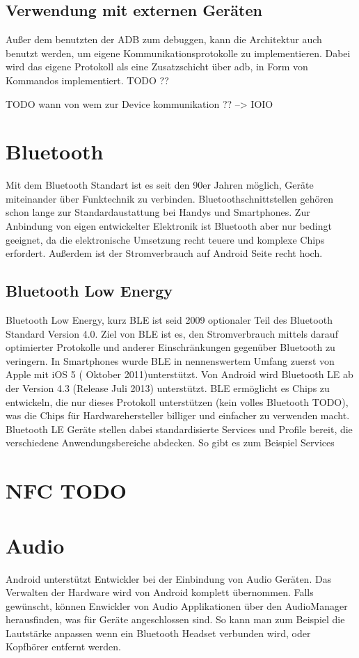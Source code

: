 \documentclass[12pt,journal,compsoc]{IEEEtran}
\begin{document}
\subsection{Verwendung mit externen Geräten}
Außer dem benutzten der ADB zum debuggen, kann die Architektur auch benutzt werden, um eigene Kommunikationsprotokolle zu implementieren.
Dabei wird das eigene Protokoll als eine Zusatzschicht über adb, in Form von Kommandos implementiert. TODO ??


TODO wann von wem zur Device kommunikation ?? --> IOIO

\section{Bluetooth}
Mit dem Bluetooth Standart ist es seit den 90er Jahren möglich, Geräte miteinander über Funktechnik zu verbinden. Bluetoothschnittstellen gehören schon lange zur Standardaustattung bei Handys und Smartphones. Zur Anbindung von eigen entwickelter Elektronik ist Bluetooth aber nur bedingt geeignet, da die elektronische Umsetzung recht teuere und komplexe Chips erfordert. Außerdem ist der Stromverbrauch auf Android Seite recht hoch.
\subsection{Bluetooth Low Energy}
Bluetooth Low Energy, kurz BLE ist seid 2009 optionaler Teil des Bluetooth Standard Version 4.0. 
Ziel von BLE ist es, den Stromverbrauch mittels darauf optimierter Protokolle und anderer Einschränkungen gegenüber Bluetooth zu veringern.
In Smartphones wurde BLE in nennenswertem Umfang zuerst von Apple mit iOS 5 ( Oktober 2011)unterstützt.
Von Android wird Bluetooth LE ab der Version 4.3 (Release Juli 2013) unterstützt.
BLE ermöglicht es Chips zu entwickeln, die nur dieses Protokoll unterstützen (kein volles Bluetooth TODO), was die Chips für Hardwarehersteller billiger und einfacher zu verwenden macht.
Bluetooth LE Geräte stellen dabei standardisierte Services und Profile bereit, die verschiedene Anwendungsbereiche abdecken.
So gibt es zum Beispiel Services  
\cite{bluetooth}

\section{NFC TODO}


\section{Audio}
Android unterstützt Entwickler bei der Einbindung von Audio Geräten. Das Verwalten der Hardware wird von Android komplett übernommen.
Falls gewünscht, können Enwickler von Audio Applikationen über den AudioManager herausfinden, was für Geräte angeschlossen sind. So kann man zum Beispiel die Lautstärke anpassen wenn ein Bluetooth Headset verbunden wird, oder Kopfhörer entfernt werden.
\end{document}
